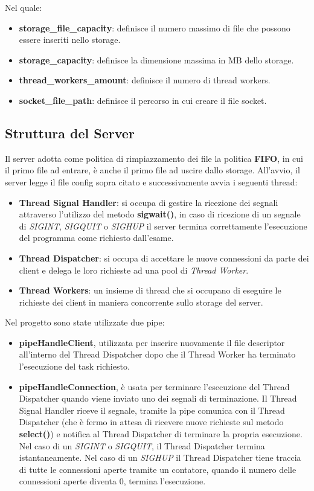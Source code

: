 \documentclass{article}
\begin{document}
Nel quale:
\begin{itemize}
    \itemsep 0em 
    \item \textbf{storage\_file\_capacity}: definisce il numero massimo di file che possono essere inseriti nello storage.
    \item \textbf{storage\_capacity}: definisce la dimensione massima in MB dello storage.
    \item \textbf{thread\_workers\_amount}: definisce il numero di thread workers.
    \item \textbf{socket\_file\_path}: definisce il percorso in cui creare il file socket.
\end{itemize}

\subsection{Struttura del Server}

Il server adotta come politica di rimpiazzamento dei file la politica \textbf{FIFO}, in cui il primo file ad entrare, è anche il primo file ad uscire dallo storage. All'avvio,
il server legge il file config sopra citato e successivamente avvia i seguenti thread:

\begin{itemize}
    \itemsep 0em 
    \item \textbf{Thread Signal Handler}: si occupa di gestire la ricezione dei segnali attraverso l'utilizzo del metodo \textbf{sigwait()}, in caso di ricezione di un segnale di 
    \textit{SIGINT}, \textit{SIGQUIT} o \textit{SIGHUP} il server termina correttamente l'esecuzione del programma come richiesto dall'esame.
    \item \textbf{Thread Dispatcher}: si occupa di accettare le nuove connessioni da parte dei client e delega le loro richieste ad una pool di \textit{Thread Worker}.
    \item \textbf{Thread Workers}: un insieme di thread che si occupano di eseguire le richieste dei client in maniera concorrente sullo storage del server.
\end{itemize}

Nel progetto sono state utilizzate due pipe:
\begin{itemize}
    \itemsep 0em 
    \item \textbf{pipeHandleClient}, utilizzata per inserire nuovamente il file descriptor all'interno del Thread Dispatcher dopo che il Thread Worker ha terminato l'esecuzione del task richiesto.
    \item \textbf{pipeHandleConnection}, è usata per terminare l'esecuzione del Thread Dispatcher quando viene inviato uno dei segnali di terminazione. Il Thread Signal Handler
    riceve il segnale, tramite la pipe comunica con il Thread Dispatcher (che è fermo in attesa di ricevere nuove richieste sul metodo \textbf{select()}) e notifica al Thread Dispatcher di
    terminare la propria esecuzione. Nel caso di un \textit{SIGINT} o \textit{SIGQUIT}, il Thread Dispatcher termina istantaneamente. Nel caso di un \textit{SIGHUP} il Thread Dispatcher tiene traccia di tutte
    le connessioni aperte tramite un contatore, quando il numero delle connessioni aperte diventa 0, termina l'esecuzione.
\end{itemize}
\end{document}
